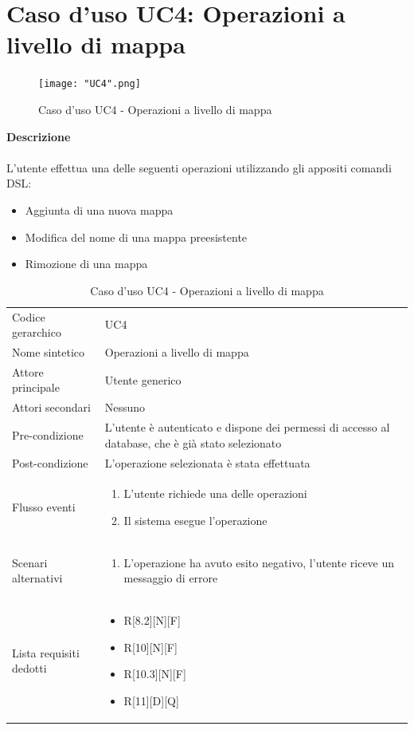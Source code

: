 \documentclass[a4paper]{report}
\begin{document}
	 \section{Caso d'uso UC4: Operazioni a livello di mappa}
	 \begin{figure}[H]
			\centering
			\texttt{[image: "UC4".png]}
			\caption{Caso d'uso UC4 - Operazioni a livello di mappa}
		\end{figure}
	 \textbf{Descrizione} \\ \\
	 L'utente effettua una delle seguenti operazioni utilizzando gli appositi comandi DSL:
	 \begin{itemize}
	 	\item Aggiunta di una nuova mappa
	 	\item Modifica del nome di una mappa preesistente
	 	\item Rimozione di una mappa
	 \end{itemize}
		\begin{table}[H]
		\begin{tabularx}{\textwidth}{X | X}\toprule
			\rowcolor{orange!65}Codice gerarchico & UC4 \\
			Nome sintetico &  Operazioni a livello di mappa \\
			\rowcolor{orange!65}Attore principale & Utente generico\\
			Attori secondari & Nessuno \\
			\rowcolor{orange!65}Pre-condizione & L'utente è autenticato e dispone dei permessi di accesso
			al database, che è già stato selezionato\\
			Post-condizione & L'operazione selezionata è stata effettuata\\
			\rowcolor{orange!65}Flusso eventi & \begin{enumerate}
			\item L'utente richiede una delle operazioni
			\item Il sistema esegue l'operazione
			\end{enumerate} \\
			Scenari alternativi & \begin{enumerate}
			\item L'operazione ha avuto esito negativo, l'utente riceve un messaggio di errore
			\end{enumerate} \\
			\rowcolor{orange!65}Lista requisiti dedotti & \begin{itemize}
				\item R[8.2][N][F]
				\item R[10][N][F]
				\item R[10.3][N][F]
				\item R[11][D][Q]
				\end{itemize} \\
			\bottomrule
		\end{tabularx}
		\caption{Caso d'uso UC4 - Operazioni a livello di mappa}
	 \end{table}
\end{document}
